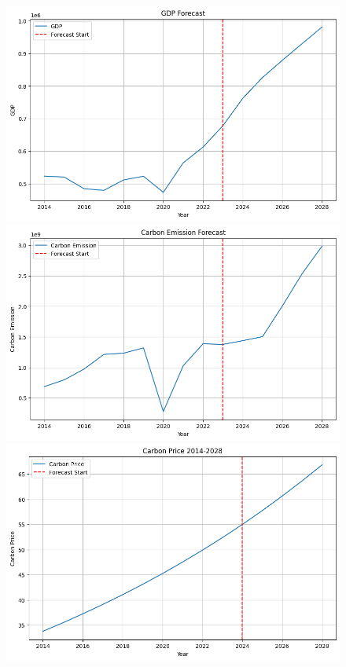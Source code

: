 \begin{figure}[H]
    \centering
    \begin{minipage}[t]{0.32\textwidth}
        \centering
        \includegraphics[width=1\textwidth]{GDP_Sitka.png}
    \end{minipage}
    \hfill
    \begin{minipage}[t]{0.32\textwidth}
        \centering
        \includegraphics[width=1\textwidth]{C_Emission_Sitka.png}
    \end{minipage}
    \hfill
    \begin{minipage}[t]{0.32\textwidth}
        \centering
        \includegraphics[width=1\textwidth]{C_Price_Sitka.png}
    \end{minipage}
\end{figure}



